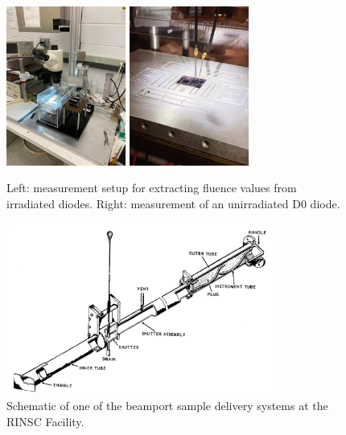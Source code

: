 \begin{figure}[!hbt]
  \begin{center}
    \includegraphics[width=0.35\textwidth]{figures/CVIV_Setup}
    \includegraphics[width=0.35\textwidth]{figures/D0_Measurement}
    \caption{Left: measurement setup for extracting fluence values from irradiated diodes. Right: measurement of an unirradiated D0 diode.}
    \label{fig:Fluence_Measurement_Setup}
  \end{center}
\end{figure}

\begin{figure}[!hbt]
  \begin{center}
    \includegraphics[width=0.80\textwidth]{figures/Beamport_Schematic}
    \caption{Schematic of one of the beamport sample delivery systems at the RINSC Facility.}
    \label{fig:Beamport_Schematic}
  \end{center}
\end{figure}

